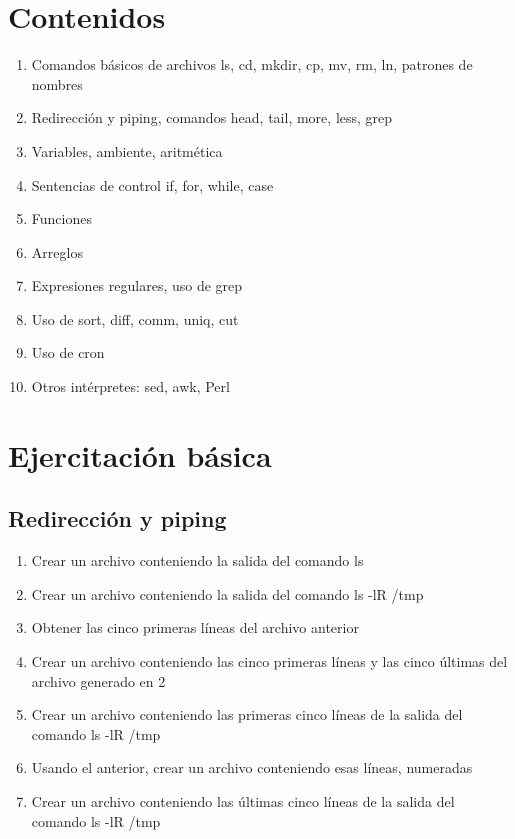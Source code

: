 \section {Contenidos}

\begin{enumerate}
\item Comandos básicos de archivos ls, cd, mkdir, cp, mv, rm, ln, patrones de nombres
\item Redirección y piping, comandos head, tail, more, less, grep
\item Variables, ambiente, aritmética
\item Sentencias de control if, for, while, case
\item Funciones
\item Arreglos
\item Expresiones regulares, uso de grep
\item Uso de sort, diff, comm, uniq, cut
\item Uso de cron
\item Otros intérpretes: sed, awk, Perl
\end{enumerate}

\section{Ejercitación básica}

\subsection{Redirección y piping}
\begin{enumerate}
	\item Crear un archivo conteniendo la salida del comando ls
	\item Crear un archivo conteniendo la salida del comando ls -lR /tmp
	\item Obtener las cinco primeras líneas del archivo anterior
	\item Crear un archivo conteniendo las cinco primeras líneas y las cinco  últimas del archivo generado en 2
	\item Crear un archivo conteniendo las primeras cinco líneas de la salida del comando ls -lR /tmp
	\item Usando el anterior, crear un archivo conteniendo esas líneas, numeradas
	\item Crear un archivo conteniendo las últimas cinco líneas de la salida del comando ls -lR /tmp
\end{enumerate}


